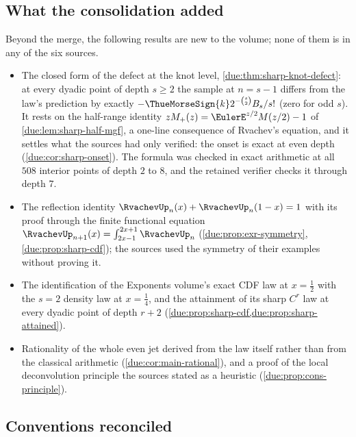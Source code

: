 \documentclass[11pt,oneside]{article}
\theoremstyle{plain}
\theoremstyle{definition}
\theoremstyle{remark}
\newcommand{\upn}[1]{\RvachevUp_{#1}}
\begin{document}
\subsection{What the consolidation added}

Beyond the merge, the following results are new to the volume; none of them
is in any of the six sources.
\begin{itemize}
\item The closed form of the defect at the knot level,
  \cref{due:thm:sharp-knot-defect}: at every dyadic point of depth \(s\ge2\)
  the sample at \(n=s-1\) differs from the law's prediction by exactly
  \(-\ThueMorseSign{k}2^{-\binom s2}B_{s}/s!\) (zero for odd \(s\)).  It rests
  on the half-range identity \(zM_{+}(z)=\EulerE^{z/2}M(z/2)-1\) of
  \cref{due:lem:sharp-half-mgf}, a one-line consequence of Rvachev's
  equation, and it settles what the sources had only verified: the onset is
  exact at even depth (\cref{due:cor:sharp-onset}).  The formula was checked
  in exact arithmetic at all \(508\) interior points of depth \(2\) to \(8\), and
  the retained verifier checks it through depth \(7\).
\item The reflection identity \(\upn{n}(x)+\upn{n}(1-x)=1\) with its proof
  through the finite functional equation
  \(\upn{n+1}(x)=\int_{2x-1}^{2x+1}\upn{n}\) (\cref{due:prop:exr-symmetry},
  \cref{due:prop:sharp-cdf}); the sources used the symmetry of their examples
  without proving it.
\item The identification of the Exponents volume's exact CDF law at
  \(x=\tfrac12\) with the \(s=2\) density law at \(x=\tfrac14\), and the
  attainment of its sharp \(C^{r}\) law at every dyadic point of depth
  \(r+2\) (\cref{due:prop:sharp-cdf,due:prop:sharp-attained}).
\item Rationality of the whole even jet derived from the law itself rather
  than from the classical arithmetic (\cref{due:cor:main-rational}), and a
  proof of the local deconvolution principle the sources stated as a
  heuristic (\cref{due:prop:cons-principle}).
\end{itemize}

\subsection{Conventions reconciled}
\end{document}
